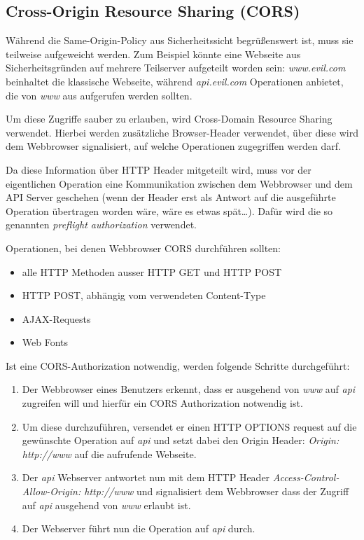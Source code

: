 \subsection{Cross-Origin Resource Sharing (CORS)}

Während die Same-Origin-Policy aus Sicherheitssicht begrüßenswert ist, muss sie teilweise aufgeweicht werden. Zum Beispiel könnte eine Webseite aus Sicherheitsgründen auf mehrere Teilserver aufgeteilt worden sein: \textit{www.evil.com} beinhaltet die klassische Webseite, während \textit{api.evil.com} Operationen anbietet, die von \textit{www} aus aufgerufen werden sollten.

Um diese Zugriffe sauber zu erlauben, wird Cross-Domain Resource Sharing verwendet. Hierbei werden zusätzliche Browser-Header verwendet, über diese wird dem Webbrowser signalisiert, auf welche Operationen zugegriffen werden darf.

Da diese Information über HTTP Header mitgeteilt wird, muss vor der eigentlichen Operation eine Kommunikation zwischen dem Webbrowser und dem API Server geschehen (wenn der Header erst als Antwort auf die ausgeführte Operation übertragen worden wäre, wäre es etwas spät\ldots). Dafür wird die so genannten \textit{preflight authorization} verwendet.

Operationen, bei denen Webbrowser CORS durchführen sollten:

\begin{itemize}
	\item alle HTTP Methoden ausser HTTP GET und HTTP POST
	\item HTTP POST, abhängig vom verwendeten Content-Type
	\item AJAX-Requests
	\item Web Fonts
\end{itemize}

Ist eine CORS-Authorization notwendig, werden folgende Schritte durchgeführt:

\begin{enumerate}
	\item Der Webbrowser eines Benutzers erkennt, dass er ausgehend von \textit{www} auf \textit{api} zugreifen will und hierfür ein CORS Authorization notwendig ist.
	\item Um diese durchzuführen, versendet er einen HTTP OPTIONS request auf die gewünschte Operation auf \textit{api} und setzt dabei den Origin Header: \textit{Origin: http://www} auf die aufrufende Webseite.
	\item Der \textit{api} Webserver antwortet nun mit dem HTTP Header \textit{Access-Control-Allow-Origin: http://www} und signalisiert dem Webbrowser dass der Zugriff auf \textit{api} ausgehend von \textit{www} erlaubt ist.
	\item Der Webserver führt nun die Operation auf \textit{api} durch.
\end{enumerate}

